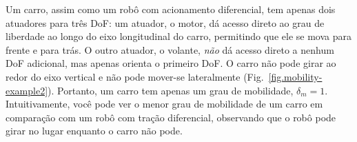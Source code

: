 
Um carro, assim como um robô com acionamento diferencial, tem apenas dois atuadores para três DoF: um atuador, o motor, dá acesso direto ao grau de liberdade ao longo do eixo longitudinal do carro, permitindo que ele se mova para frente e para trás. O outro atuador, o volante, \emph{não} dá acesso direto a nenhum DoF adicional, mas apenas orienta o primeiro DoF. O carro não pode girar ao redor do eixo vertical e não pode mover-se lateralmente (Fig.~\ref{fig.mobility-example2}). Portanto, um carro tem apenas um grau de mobilidade, $\delta_m = 1$. Intuitivamente, você pode ver o menor grau de mobilidade de um carro em comparação com um robô com tração diferencial, observando que o robô pode girar no lugar enquanto o carro não pode.


